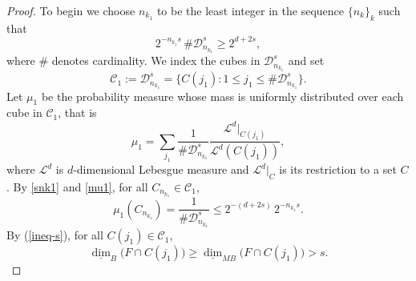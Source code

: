 \documentclass[12pt]{article}
\newcommand{\1}{{\bf 1}}
\newcommand{\D}{\mathcal{D}}
\begin{document}
\begin{proof}
To begin we choose $n_{k_1}$ to be the least  integer in the sequence $\{n_k\}_k$ such that  
	 \begin{equation}\label{snk1}
	 	2^{-{n_{k_1}}s}\,\#\D_{n_{k_1}}^s\geq 2^{d+2s},
	 \end{equation}  
	 where $\#$ denotes cardinality.
	We index the cubes in $\D_{n_{k_1}}^s$ and set  
	$$\mathcal{C}_{1}:=\D_{n_{k_1}}^s=\{C(j_1):1\leq j_1\leq \#\D_{n_{k_1}}^s\}.$$
	Let $\mu_1$  be the probability measure whose mass is uniformly distributed over each cube in $ \mathcal{C}_{1}$, that is
	\begin{equation}\label{mu1}
		\mu_1=\sum_{j_1}\frac{1}{\#\D_{n_{k_1}}^s}\dfrac{\mathcal{L}^d|_{C(j_1)}}{\mathcal{L}^d(C(j_1))},
	\end{equation}
	where $\mathcal{L}^d$ is $d$-dimensional Lebesgue measure and $\mathcal{L}^d|_C$ is its restriction to a set $C$.
	By \eqref{snk1} and \eqref{mu1}, for all $C_{n_{k_1}}\in \mathcal{C}_{1}$, 
	\begin{equation*}\label{k-1-1}
		\mu_1(C_{n_{k_1}})=\frac{1}{\#\D_{n_{k_1}}^s}\leq 2^{-(d+2s)}\,2^{-n_{k_1}s}.
	\end{equation*}
	By (\ref{ineq-s}), for all $C(j_1)\in\mathcal{C}_1$, 
	$$\underline{\dim}_B\big(F\cap C(j_1)\big)\geq\underline{\dim}_{MB}\big(F\cap C(j_1)\big)> s.$$
	

\end{proof}
\end{document}
